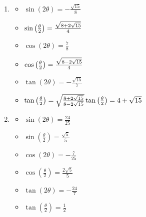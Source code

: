 \documentclass{ximera}
\begin{document}
\begin{enumerate}
\begin{multicols}{3}
\begin{itemize}
\end{itemize}

\end{multicols}

\item \begin{multicols}{3}

\begin{itemize}

\item $\sin(2\theta) = -\frac{\sqrt{15}}{8}$
\item $\sin\left(\frac{\theta}{2}\right) =\frac{\sqrt{8+2\sqrt{15}}}{4} \\ \phantom{\tan\left(\frac{\theta}{2}\right) = 4+\sqrt{15}}$ 
\item $\cos(2\theta) = \frac{7}{8}$
\item $\cos\left(\frac{\theta}{2}\right) = \frac{\sqrt{8-2\sqrt{15}}}{4} \\ \phantom{\tan\left(\frac{\theta}{2}\right) = 4+\sqrt{15}} $
\item $\tan(2\theta) = -\frac{\sqrt{15}}{7}$
\item $\tan\left(\frac{\theta}{2}\right) = \sqrt{\frac{8+2\sqrt{15}}{8-2\sqrt{15}}} \\ \tan\left(\frac{\theta}{2}\right) = 4+\sqrt{15}$

\end{itemize}

\end{multicols}

\item \begin{multicols}{3}

\begin{itemize}

\item $\sin(2\theta) = \frac{24}{25}$
\item $\sin\left(\frac{\theta}{2}\right) = \frac{\sqrt{5}}{5}$
\item $\cos(2\theta) = -\frac{7}{25}$
\item $\cos\left(\frac{\theta}{2}\right) = \frac{2\sqrt{5}}{5}$
\item $\tan(2\theta)=-\frac{24}{7} $
\item $\tan\left(\frac{\theta}{2}\right) = \frac{1}{2}$

\end{itemize}

\end{multicols}

\pagebreak


\end{enumerate}
\end{document}
